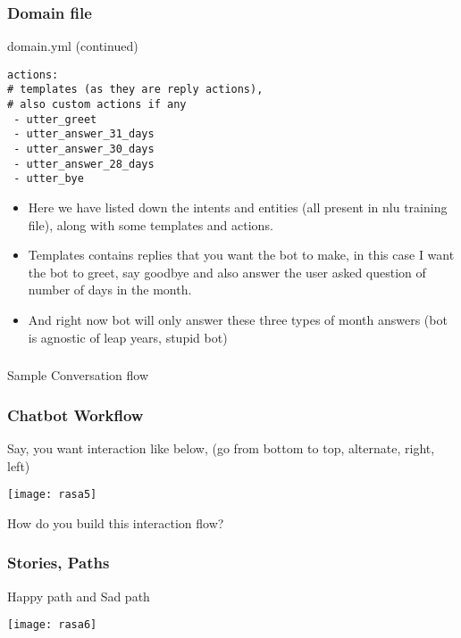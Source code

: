  \begin{frame}[fragile]\frametitle{Domain file}
domain.yml (continued)
\begin{lstlisting}
actions:
# templates (as they are reply actions),
# also custom actions if any
 - utter_greet
 - utter_answer_31_days
 - utter_answer_30_days
 - utter_answer_28_days
 - utter_bye
\end{lstlisting}

\begin{itemize}
\item Here we have listed down the intents and entities (all present in nlu training file), along with some templates and actions. 
\item Templates contains replies that you want the bot to make, in this case I want the bot to greet, say goodbye and also answer the user asked question of number of days in the month. 
\item And right now bot will only answer these three types of month answers (bot is agnostic of leap years, stupid bot)
\end{itemize}
\end{frame}


\begin{frame}[fragile]\frametitle{}
\begin{center}
{\Large Sample Conversation flow}

\end{center}
\end{frame}


\begin{frame}[fragile]\frametitle{Chatbot Workflow}

Say, you want interaction like below, (go from bottom to top, alternate, right, left)

\begin{center}
\texttt{[image: rasa5]}
\end{center}

How do you build this interaction flow?


\end{frame}


\begin{frame}[fragile]\frametitle{Stories, Paths}

Happy path and Sad path

\begin{center}
\texttt{[image: rasa6]}
\end{center}



\end{frame}


